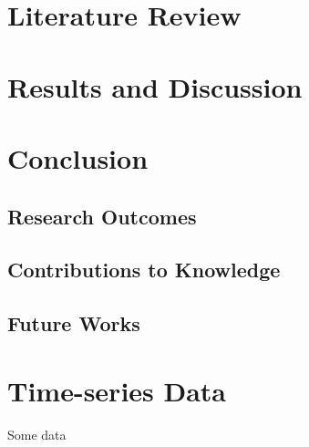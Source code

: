 \documentclass[oneside]{utmthesis}
\begin{document}
\listofsymbols
{}


\listofappendices


\mainmatter





\chapter{Literature Review}



\chapter{Results and Discussion}

\chapter{Conclusion}
\section{Research Outcomes}
\section{Contributions to Knowledge}
\section{Future Works}

%

%


\appendix
\chapter{Time-series Data}
Some data

\listofpublications
\end{document}
